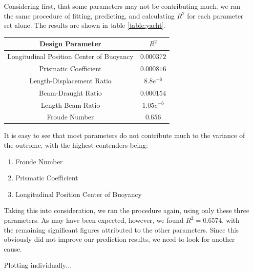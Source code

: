 \documentclass[11pt,a4paper]{article}
\begin{document}
Considering first, that some parameters may not be contributing much, we ran the same procedure of fitting, predicting, and calculating $R^2$ for each parameter set alone. The results are shown in table \ref{table:yacht}.

\begin{center}\label{table:yacht}
 \begin{tabular}{||c | c||} 
 \hline
 Design Parameter & $R^2$ \\ [0.5ex] 
 \hline\hline
 Longitudinal Position Center of Buoyancy & $0.000372$ \\ 
 \hline
 Prismatic Coefficient & $0.000816$ \\
 \hline
 Length-Displacement Ratio & $8.8e^{-6}$ \\
 \hline
 Beam-Draught Ratio & $0.000154$ \\
 \hline
 Length-Beam Ratio & $1.05e^{-6}$ \\
 \hline
 Froude Number & $0.656$ \\ [1ex] 
 \hline
\end{tabular}
\end{center}

It is easy to see that most parameters do not contribute much to the variance of the outcome, with the highest contenders being:

\begin{enumerate}
\item Froude Number
\item Prismatic Coefficient
\item Longitudinal Position Center of Buoyancy
\end{enumerate}

Taking this into consideration, we ran the procedure again, using only these three parameters. As may have been expected, however, we found $R^2 = 0.6574$, with the remaining significant figures attributed to the other parameters. Since this obviously did not improve our prediction results, we need to look for another cause.

Plotting individually...
\end{document}
